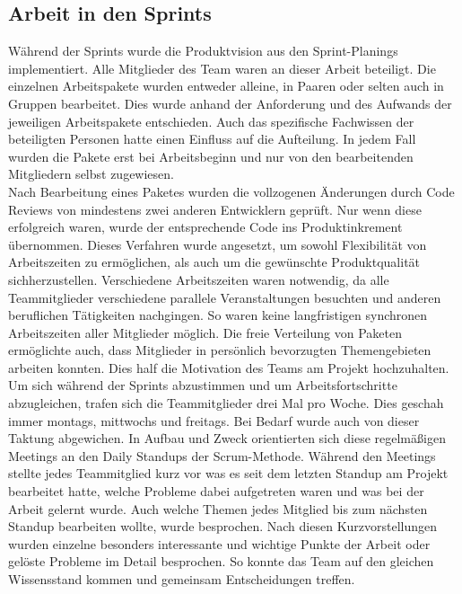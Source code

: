 \documentclass[10pt, a4paper]{article}
\begin{document}
\subsection{Arbeit in den Sprints}
Während der Sprints wurde die Produktvision aus den Sprint-Planings implementiert.
Alle Mitglieder des Team waren an dieser Arbeit beteiligt.
Die einzelnen Arbeitspakete wurden entweder alleine, in Paaren oder selten auch in Gruppen bearbeitet.
Dies wurde anhand der Anforderung und des Aufwands der jeweiligen Arbeitspakete entschieden.
Auch das spezifische Fachwissen der beteiligten Personen hatte einen Einfluss auf die Aufteilung.
In jedem Fall wurden die Pakete erst bei Arbeitsbeginn und nur von den bearbeitenden Mitgliedern selbst zugewiesen.
\\
Nach Bearbeitung eines Paketes wurden die vollzogenen Änderungen durch Code Reviews von mindestens zwei anderen Entwicklern geprüft.
Nur wenn diese erfolgreich waren, wurde der entsprechende Code ins Produktinkrement übernommen.
Dieses Verfahren wurde angesetzt, um sowohl Flexibilität von Arbeitszeiten zu ermöglichen, als auch um die gewünschte Produktqualität sichherzustellen.
Verschiedene Arbeitszeiten waren notwendig, da alle Teammitglieder verschiedene parallele Veranstaltungen besuchten und anderen beruflichen Tätigkeiten nachgingen.
So waren keine langfristigen synchronen Arbeitszeiten aller Mitglieder möglich.
Die freie Verteilung von Paketen ermöglichte auch, dass Mitglieder in persönlich bevorzugten Themengebieten arbeiten konnten.
Dies half die Motivation des Teams am Projekt hochzuhalten.
\\
Um sich während der Sprints abzustimmen und um Arbeitsfortschritte abzugleichen, trafen sich die Teammitglieder drei Mal pro Woche.
Dies geschah immer montags, mittwochs und freitags.
Bei Bedarf wurde auch von dieser Taktung abgewichen.
In Aufbau und Zweck orientierten sich diese regelmäßigen Meetings an den \glqq Daily Standups\grqq{} der Scrum-Methode.
Während den Meetings stellte jedes Teammitglied kurz vor was es seit dem letzten Standup am Projekt bearbeitet hatte, welche Probleme dabei aufgetreten waren und was bei der Arbeit gelernt wurde.
Auch welche Themen jedes Mitglied bis zum nächsten Standup bearbeiten wollte, wurde besprochen.
Nach diesen Kurzvorstellungen wurden einzelne besonders interessante und wichtige Punkte der Arbeit oder gelöste Probleme im Detail besprochen.
So konnte das Team auf den gleichen Wissensstand kommen und gemeinsam Entscheidungen treffen.
\end{document}
